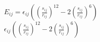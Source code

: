 \documentclass{article}
\begin{document}
\changefontsizes{20pt}
$E_{ij}=\epsilon_{ij}\left(\left(\frac{s_{ij}}{r_{ij}}\right)^{12}-2\left(\frac{s_{ij}}{r_{ij}}\right)^{6}\right)$ \\

$\epsilon_{ij}\left(\left(\frac{s_{ij}}{r_{ij}}\right)^{12}-2\left(\frac{s_{ij}}{r_{ij}}\right)^{6}\right)$ \\
\end{document}
